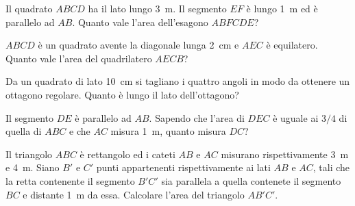 \begin{multicols}{2}
\begin{esercizio}
\label{ese:7.104}
Il quadrato $ABCD$ ha il lato lungo 3~m. Il segmento $EF$ è lungo 1~m ed è parallelo ad $AB$. Quanto vale l'area dell'esagono $ABFCDE$?
\end{esercizio}

	\centering

\begin{esercizio}
\label{ese:7.105}
$ABCD$ è un quadrato avente la diagonale lunga 2~cm e $AEC$ è equilatero. Quanto vale l'area del quadrilatero $AECB$?
\end{esercizio}

	\centering

\begin{esercizio}
\label{ese:7.106}
Da un quadrato di lato 10~cm si tagliano i quattro angoli in modo da ottenere un ottagono regolare. Quanto è lungo il lato dell'ottagono?
\end{esercizio}

	\centering

\begin{esercizio}
\label{ese:7.107}
Il segmento $DE$ è parallelo ad $AB$. Sapendo che l'area di $DEC$ è uguale ai $3/4$ di quella di $ABC$ e che $AC$ misura 1~m, quanto misura $DC$?
\end{esercizio}

	\centering

\begin{esercizio}
\label{ese:7.108}
Il triangolo $ABC$ è rettangolo ed i cateti $AB$ e $AC$ misurano rispettivamente 3~m e 4~m. Siano $B'$ e $C'$ punti appartenenti rispettivamente ai lati $AB$ e $AC$, tali che la retta contenente il segmento $B'C'$ sia parallela a quella contenete il segmento $BC$ e distante 1~m da essa. Calcolare l'area del triangolo $AB'C'$.
\end{esercizio}


\end{multicols}
